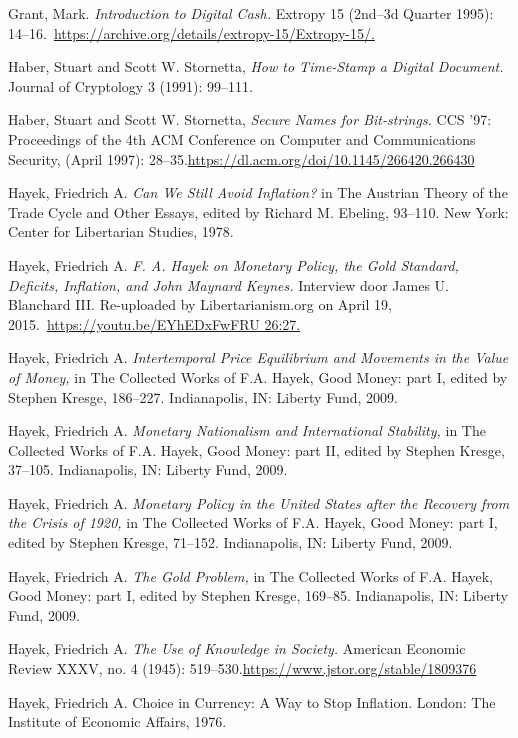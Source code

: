 \documentclass[smalldemyvopaper,11pt,twoside,onecolumn,openright,extrafontsizes,hidelinks]{memoir}
\begin{document}
Grant, Mark. \emph{Introduction to Digital Cash.} Extropy 15 (2nd--3d
Quarter 1995):
14--16.~\href{https://archive.org/details/extropy-15/Extropy-15/}{https://archive.org/details/extropy-15/Extropy-15/.}

Haber, Stuart and Scott W. Stornetta, \emph{How to Time-Stamp a Digital
Document.} Journal of Cryptology 3 (1991): 99--111.

Haber, Stuart and Scott W. Stornetta, \emph{Secure Names for
Bit-strings.} CCS '97: Proceedings of the 4th ACM Conference on Computer
and Communications Security, (April 1997):
28--35.\url{https://dl.acm.org/doi/10.1145/266420.266430}

Hayek, Friedrich A. \emph{Can We Still Avoid Inflation?} in The Austrian
Theory of the Trade Cycle and Other Essays, edited by Richard M.
Ebeling, 93--110. New York: Center for Libertarian Studies, 1978.

Hayek, Friedrich A. \emph{F. A. Hayek on Monetary Policy, the Gold
Standard, Deficits, Inflation, and John Maynard Keynes.} Interview door
James U. Blanchard III. Re-uploaded by Libertarianism.org on April 19,
2015.~\href{https://youtu.be/EYhEDxFwFRU\%2026:27.}{https://youtu.be/EYhEDxFwFRU
26:27.}

Hayek, Friedrich A. \emph{Intertemporal Price Equilibrium and Movements
in the Value of Money,} in The Collected Works of F.A. Hayek, Good
Money: part I, edited by Stephen Kresge, 186--227. Indianapolis, IN:
Liberty Fund, 2009.

Hayek, Friedrich A. \emph{Monetary Nationalism and International
Stability,} in The Collected Works of F.A. Hayek, Good Money: part II,
edited by Stephen Kresge, 37--105. Indianapolis, IN: Liberty Fund, 2009.

Hayek, Friedrich A. \emph{Monetary Policy in the United States after the
Recovery from the Crisis of 1920,} in The Collected Works of F.A. Hayek,
Good Money: part I, edited by Stephen Kresge, 71--152. Indianapolis, IN:
Liberty Fund, 2009.

Hayek, Friedrich A. \emph{The Gold Problem,} in The Collected Works of
F.A. Hayek, Good Money: part I, edited by Stephen Kresge, 169--85.
Indianapolis, IN: Liberty Fund, 2009.

Hayek, Friedrich A. \emph{The Use of Knowledge in Society.} American
Economic Review XXXV, no. 4 (1945):
519--530.\url{https://www.jstor.org/stable/1809376}

Hayek, Friedrich A. Choice in Currency: A Way to Stop Inflation. London:
The Institute of Economic Affairs, 1976.
\end{document}
